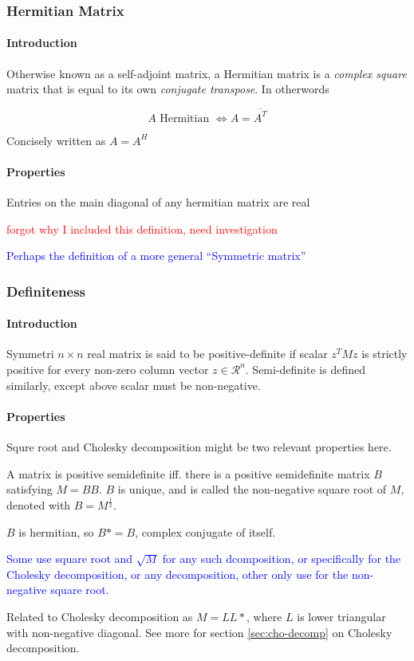 \subsubsection{Hermitian Matrix}
\paragraph{Introduction} Otherwise known as a self-adjoint matrix,
a Hermitian matrix is a \emph{complex square} matrix that is equal
to its own \emph{conjugate transpose}. In otherwords

\begin{equation*}
    A \text{ Hermitian } \Leftrightarrow A = \overline{{A^T}}
\end{equation*}

Concisely written as $A = A^H$

\paragraph{Properties}

Entries on the main diagonal of any hermitian matrix are real

\textcolor{red}{forgot why I included this definition, need investigation}

\textcolor{blue}{Perhaps the definition of a more general ``Symmetric matrix''}

\subsubsection{Definiteness}

\paragraph{Introduction} Symmetri $n \times n$ real matrix is said to be
positive-definite if scalar $z^TMz$ is strictly positive for every non-zero
column vector $z \in \mathcal{R}^n$. Semi-definite is defined similarly,
except above scalar must be non-negative. 

\paragraph{Properties} Squre root and Cholesky decomposition might be 
two relevant properties here.

A matrix is positive semidefinite iff. there is a positive semidefinite
matrix $B$ satisfying $M = BB$. $B$ is unique, and is called the 
non-negative square root of $M$, denoted with $B = M^{\frac{1}{2}}$.

$B$ is hermitian, so $B* = B$, complex conjugate of itself. 

\textcolor{blue}{Some use square root and $\sqrt{M}$ for any such dcomposition,
or specifically for the Cholesky decomposition, or any decomposition, other
only use for the non-negative square root.}

Related to Cholesky decomposition as $M = LL*$, where $L$ is lower
triangular with non-negative diagonal. See more for section
\ref{sec:cho-decomp} on Cholesky decomposition.

